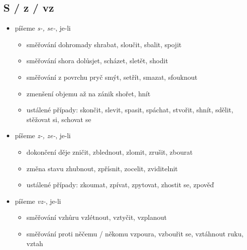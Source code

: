\documentclass{memoir}
\begin{document}
\subsection*{S / z / vz}
\begin{itemize}
\item píšeme \textit{s-, se-}, je-li
\begin{itemize}
\item směřování dohromady \hfill shrabat, sloučit, sbalit, spojit
	\item směřování shora dolů\hfill sjet, scházet, sletět, shodit
	\item směřování z povrchu pryč \hfill smýt, setřít, smazat, sfouknout
	\item zmenšení objemu až na zánik \hfill shořet, hnít
	\item ustálené případy: skončit, slevit, spasit, spáchat, stvořit, shnít, sdělit, stěžovat si, schovat se
\end{itemize}
\item píšeme \textit{z-, ze-}, je-li
\begin{itemize}
\item dokončení děje \hfill zničit, zblednout, zlomit, zrušit, zbourat
\item změna stavu \hfill zhubnout, zpřísnit, zocelit, zviditelnit
\item ustálené případy: zkoumat, zpívat, zpytovat, zhostit se, zpověď
\end{itemize}
\item píšeme \textit{vz-}, je-li
\begin{itemize}
\item směřování vzhůru \hfill  vzlétnout, vztyčit, vzplanout
\item směřování proti něčemu / někomu \hfill vzpoura, vzbouřit se, vztáhnout ruku, vztah
\end{itemize}
\end{itemize}
\end{document}
